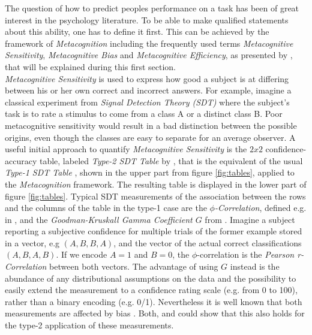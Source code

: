 \documentclass[../main/main.tex]{subfiles}
\begin{document}
	The question of how to predict peoples performance on a task has been of great interest in the psychology literature. To be able to make qualified statements about this ability, one has to define it first.
	This can be achieved by the framework of \textit{Metacognition} including the frequently used terms \textit{Metacognitive Sensitivity}, \textit{Metacognitive Bias} and \textit{Metacognitive Efficiency}, as presented by \citep{fleming2014measure}, that will be explained during this first section.\\
	\textit{Metacognitive Sensitivity} is used to express how good a subject is at differing between his or her own correct and incorrect answers. For example, imagine a classical experiment from \textit{Signal Detection Theory (SDT)} where the subject's task is to rate a stimulus to come from a class A or a distinct class B. Poor metacognitive sensitivity would result in a bad distinction between the possible origins, even though the classes are easy to separate for an average observer. A useful initial approach to quantify \textit{Metacognitive Sensitivity} is the $2x2$ confidence-accuracy table, labeled \textit{Type-2 SDT Table} by \citep{fleming2014measure}, that is the equivalent of the usual \textit{Type-1 SDT Table} \citep{cramer1999mathematical}, shown in the upper part from figure \ref{fig:tables}, applied to the \textit{Metacognition} framework. The resulting table is displayed in the lower part of figure \ref{fig:tables}. Typical SDT measurements of the association between the rows and the columns of the table in the type-1 case are the \textit{$\phi$-Correlation}, defined e.g. in \citep{cramer1999mathematical}, and the \textit{Goodman-Kruskall Gamma Coefficient $G$} from \citep{goodman1963measures}. Imagine a subject reporting a subjective confidence for multiple trials of the former example stored in a vector, e.g $(A, B, B, A)$, and the vector of the actual correct classifications $(A, B, A, B)$. If we encode $A=1$ and $B=0$, the $\phi$-correlation is the \textit{Pearson r-Correlation} between both vectors. The advantage of using $G$ instead is the abundance of any distributional assumptions on the data and the possibility to easily extend the measurement to a confidence rating scale (e.g. from 0 to 100), rather than a binary encoding (e.g. 0/1). Nevertheless it is well known that both measurements are affected by bias \citep{fleming2014measure}. Both, \citep{nelson1984comparison} and \citep{masson2009sources} could show that this also holds for the type-2 application of these measurements.
\end{document}
